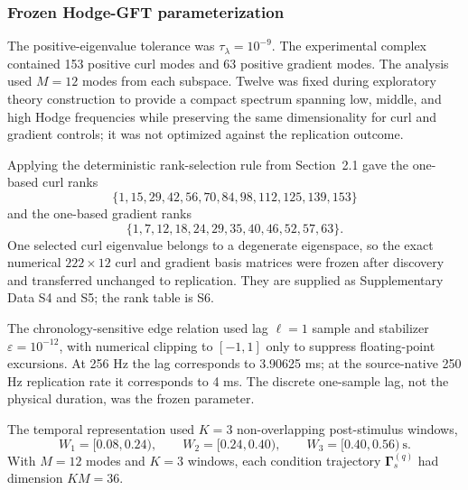 \documentclass[12pt]{article}
\begin{document}
\subsubsection{Frozen Hodge-GFT parameterization}
The positive-eigenvalue tolerance was $\tau_\lambda=10^{-9}$. The experimental complex contained 153 positive curl modes and 63 positive gradient modes. The analysis used $M=12$ modes from each subspace. Twelve was fixed during exploratory theory construction to provide a compact spectrum spanning low, middle, and high Hodge frequencies while preserving the same dimensionality for curl and gradient controls; it was not optimized against the replication outcome.

Applying the deterministic rank-selection rule from Section~2.1 gave the one-based curl ranks
\[
\{1,15,29,42,56,70,84,98,112,125,139,153\}
\]
and the one-based gradient ranks
\[
\{1,7,12,18,24,29,35,40,46,52,57,63\}.
\]
One selected curl eigenvalue belongs to a degenerate eigenspace, so the exact numerical $222\times12$ curl and gradient basis matrices were frozen after discovery and transferred unchanged to replication. They are supplied as Supplementary Data S4 and S5; the rank table is S6.

The chronology-sensitive edge relation used lag $\ell=1$ sample and stabilizer $\varepsilon=10^{-12}$, with numerical clipping to $[-1,1]$ only to suppress floating-point excursions. At 256 Hz the lag corresponds to 3.90625 ms; at the source-native 250 Hz replication rate it corresponds to 4 ms. The discrete one-sample lag, not the physical duration, was the frozen parameter.

The temporal representation used $K=3$ non-overlapping post-stimulus windows,
\[
W_1=[0.08,0.24),\qquad W_2=[0.24,0.40),\qquad W_3=[0.40,0.56)~\mathrm{s}.
\]
With $M=12$ modes and $K=3$ windows, each condition trajectory $\bm\Gamma_s^{(q)}$ had dimension $KM=36$.
\end{document}

